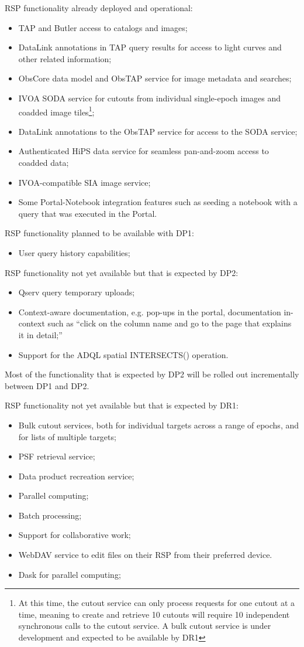RSP functionality already deployed and operational:
\begin{itemize}
\item TAP and Butler access to catalogs and images;
\item DataLink annotations in TAP query results for access to light curves and other related information;
\item ObsCore data model and ObsTAP service for image metadata and searches;
\item IVOA SODA service for cutouts from individual single-epoch images and coadded image tiles\footnote{At this time, the cutout service can only process requests for one cutout at a time, meaning to create and retrieve 10 cutouts will require 10 independent synchronous calls to the cutout service. A bulk cutout service is under development and expected to be available by DR1};
\item DataLink annotations to the ObsTAP service for access to the SODA service;
\item Authenticated HiPS data service for seamless pan-and-zoom access to coadded data;
\item IVOA-compatible SIA image service;
\item Some Portal-Notebook integration features such as  seeding a notebook with a query that was executed in the Portal.
\end{itemize}

RSP functionality planned to be available with  DP1:
\begin{itemize}
\item User query history capabilities;
\end{itemize}

RSP functionality not yet available but that is expected by DP2:
\begin{itemize}
\item Qserv query temporary uploads;
\item Context-aware documentation, e.g. pop-ups in the portal, documentation in-context such as  ``click on the column name and go to the page that explains it in detail;''
\item Support for the ADQL  spatial INTERSECTS() operation.
\end{itemize}
Most of the functionality  that is expected by DP2 will be rolled out incrementally between DP1 and DP2.

RSP functionality not yet available but that is expected by DR1:
\begin{itemize}
\item Bulk cutout services, both for individual targets across a range of epochs, and for lists of multiple targets;
\item PSF retrieval service;
\item Data product recreation service;
\item Parallel computing;
\item Batch processing;
\item Support for collaborative work;
\item WebDAV service to edit files on their RSP from their preferred device.
\item Dask for parallel computing;
\end{itemize}

